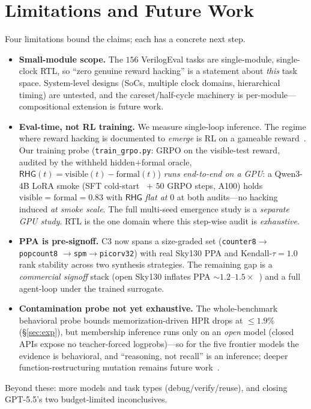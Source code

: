 \documentclass[10pt]{article}
\newcommand{\rhg}{\textsf{RHG}}
\newcommand{\hpr}{\textsf{HPR}}
\newcommand{\code}[1]{\texttt{#1}}
\begin{document}
\section{Limitations and Future Work}\label{sec:limits}
Four limitations bound the claims; each has a concrete next step.
\begin{itemize}[leftmargin=*,topsep=2pt,itemsep=2pt]
\item \textbf{Small-module scope.} The $156$ VerilogEval tasks are single-module, single-clock RTL,
so ``zero genuine reward hacking'' is a statement about \emph{this} task space. System-level designs
(SoCs, multiple clock domains, hierarchical timing) are untested, and the careset/half-cycle
machinery is per-module---compositional extension is future work.
\item \textbf{Eval-time, not RL training.} We measure single-loop inference. The regime where reward
hacking is documented to \emph{emerge} is RL on a gameable reward~\cite{baker,rlvrgaming}. Our training
probe (\code{train\_grpo.py}: GRPO on the visible-test reward, audited by the withheld hidden$+$formal
oracle, $\rhg(t)=\mathrm{visible}(t)-\mathrm{formal}(t)$) \emph{runs end-to-end on a GPU}: a Qwen3-4B
LoRA smoke (SFT cold-start~\cite{dapo} $+$ $50$ GRPO steps, A100) holds
$\mathrm{visible}=\mathrm{formal}=0.83$ with $\rhg$ \emph{flat at} $0$ at both audits---no hacking
induced \emph{at smoke scale}. The full multi-seed emergence study is a \emph{separate GPU study}.
RTL is the one domain where this step-wise audit is \emph{exhaustive}.
\item \textbf{PPA is pre-signoff.} C3 now spans a size-graded set (\code{counter8}$\to$\code{popcount8}
$\to$\code{spm}$\to$\code{picorv32}) with real Sky130 PPA and Kendall-$\tau=1.0$ rank stability across
two synthesis strategies. The remaining gap is a \emph{commercial signoff} stack (open Sky130 inflates
PPA ${\sim}1.2$--$1.5\times$~\cite{edahep}) and a full agent-loop under the trained surrogate.
\item \textbf{Contamination probe not yet exhaustive.} The whole-benchmark behavioral probe bounds
memorization-driven \hpr{} drops at $\le\!1.9\%$ (\S\ref{sec:exp}), but membership inference runs only
on an \emph{open} model (closed APIs expose no teacher-forced logprobs)---so for the five frontier
models the evidence is behavioral, and ``reasoning, not recall'' is an inference; deeper
function-restructuring mutation remains future work~\cite{minkprob,nllmem}.
\end{itemize}
Beyond these: more models and task types (debug/verify/reuse), and closing GPT-5.5's two
budget-limited inconclusives.
\end{document}
